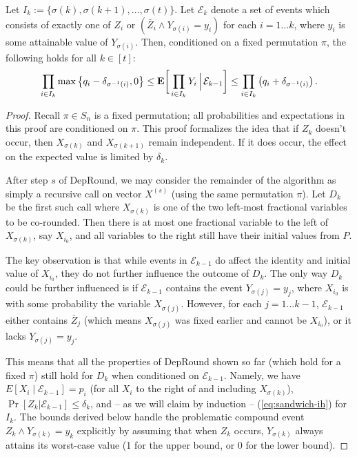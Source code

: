 \begin{lemma}\label{lemma:sandwich1} Let $I_k:=\{\sigma(k),\sigma(k+1),\ldots,\sigma(t)\}$.
Let $\mathcal{E}_k$ denote a set of events which consists of exactly one of $Z_i$ or $(\bar Z_i\land Y_{\sigma(i)}=y_i)$ for each $i=1\ldots k$, where $y_i$ is some attainable value of $Y_{\sigma(i)}$. Then, conditioned on a fixed permutation $\pi$, the following holds for all $k\in[t]$: 
\begin{equation} 
\prod_{i\in I_k} \max\left\{q_i - \delta_{\sigma^{-1}(i)},0\right\}
\le \text{\bf E}\bigg[\prod_{i\in I_k} Y_i \,\Big\rvert\, \mathcal{E}_{k-1}
\bigg]
\le \prod_{i\in I_k} \left(q_i + \delta_{\sigma^{-1}(i)}\right).
\label{eq:sandwich-ih}\end{equation}
\end{lemma}
\begin{proof}
Recall $\pi\in S_n$ is a fixed permutation; all probabilities and expectations in this proof are conditioned on $\pi$. This proof formalizes the idea that if $Z_k$ doesn't occur, then $X_{\sigma(k)}$ and $X_{\sigma(k+1)}$ remain independent. If it does occur, the effect on the expected value is limited by $\delta_k$.

After step $s$ of {\sc DepRound}, we may consider the remainder of the algorithm as simply a recursive call on vector $X^{(s)}$ (using the same permutation $\pi$). Let $D_k$ be the first such call where $X_{\sigma(k)}$ is one of the two left-most fractional variables to be co-rounded. Then there is at most one fractional variable to the left of $X_{\sigma(k)}$, say $X_{i_0}$, and all variables to the right still have their initial values from $P$.

The key observation is that while events in $\mathcal{E}_{k-1}$ do affect the identity and initial value of $X_{i_0}$, they do not further influence the outcome of $D_k$. The only way $D_k$ could be further influenced is if $\mathcal{E}_{k-1}$ contains the event $Y_{\sigma(j)}=y_j$, where $X_{i_0}$ is with some probability the variable $X_{\sigma(j)}$. However, for each $j=1\ldots k-1$, $\mathcal{E}_{k-1}$ either contains $\bar Z_j$ (which means $X_{\sigma(j)}$ was fixed earlier and cannot be $X_{i_0}$), or it lacks $Y_{\sigma(j)}=y_j$.

This means that all the properties of {\sc DepRound} shown so far (which hold for a fixed $\pi$) still hold for $D_k$ when conditioned on $\mathcal{E}_{k-1}$. Namely, we have $E[X_i\mid \mathcal{E}_{k-1}]=p_i$ (for all $X_i$ to the right of and including $X_{\sigma(k)}$), $\Pr[Z_k|\mathcal{E}_{k-1}]\le \delta_k$, and -- as we will claim by induction --  (\ref{eq:sandwich-ih}) for $I_k$.
The bounds derived below handle the problematic compound event $Z_k\land Y_{\sigma(k)}=y_k$ explicitly by assuming that when $Z_k$ occurs, $Y_{\sigma(k)}$ always attains its worst-case value (1 for the upper bound, or 0 for the lower bound).


\end{proof}
